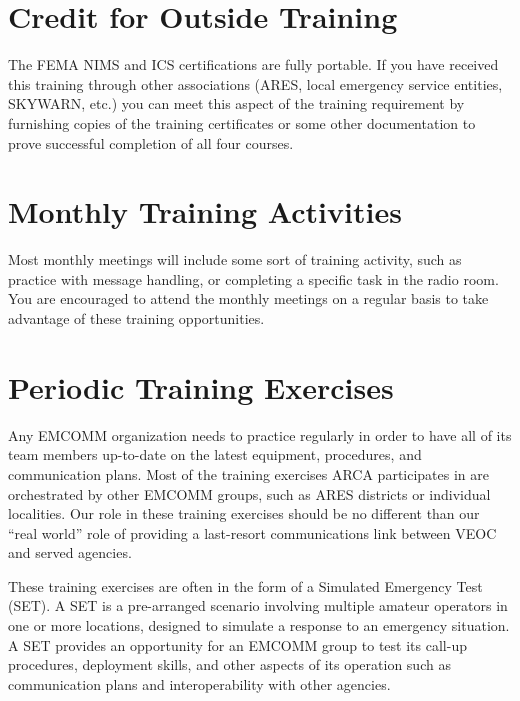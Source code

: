 \documentclass[pdflatex,letterpaper,twoside,12pt]{book}
\begin{document}
\section{Credit for Outside Training}

The FEMA NIMS and ICS certifications are fully portable.  If you have received this training through other associations (ARES, local emergency service entities, SKYWARN, etc.) you can meet this aspect of the training requirement by furnishing copies of the training certificates or some other documentation to prove successful completion of all four courses.


\section{Monthly Training Activities}

Most monthly meetings will include some sort of training activity, such as practice with message handling, or completing a specific task in the radio room.  You are encouraged to attend the monthly meetings on a regular basis to take advantage of these training opportunities.


\section{Periodic Training Exercises}

Any EMCOMM organization needs to practice regularly in order to have all of its team members up-to-date on the latest equipment, procedures, and communication plans.  Most of the training exercises ARCA participates in are orchestrated by other EMCOMM groups, such as ARES districts or individual localities.  Our role in these training exercises should be no different than our ``real world'' role of providing a last-resort communications link between VEOC and served agencies.

These training exercises are often in the form of a Simulated Emergency Test (SET).  A SET is a pre-arranged scenario involving multiple amateur operators in one or more locations, designed to simulate a response to an emergency situation.  A SET provides an opportunity for an EMCOMM group to test its call-up procedures, deployment skills, and other aspects of its operation such as communication plans and interoperability with other agencies.
\end{document}
